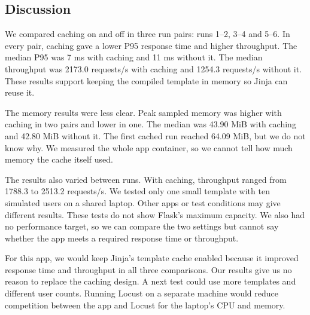 \documentclass[12pt,a4paper]{article}
\begin{document}
\subsection{Discussion}
\label{sec:performance-discussion}
We compared caching on and off in three run pairs: runs 1--2, 3--4 and 5--6. In every pair, caching gave a lower P95 response time and higher throughput. The median P95 was 7 ms with caching and 11 ms without it. The median throughput was 2173.0 requests/s with caching and 1254.3 requests/s without it. These results support keeping the compiled template in memory so Jinja can reuse it.

The memory results were less clear. Peak sampled memory was higher with caching in two pairs and lower in one. The median was 43.90 MiB with caching and 42.80 MiB without it. The first cached run reached 64.09 MiB, but we do not know why. We measured the whole app container, so we cannot tell how much memory the cache itself used.

The results also varied between runs. With caching, throughput ranged from 1788.3 to 2513.2 requests/s. We tested only one small template with ten simulated users on a shared laptop. Other apps or test conditions may give different results. These tests do not show Flask's maximum capacity. We also had no performance target, so we can compare the two settings but cannot say whether the app meets a required response time or throughput.

For this app, we would keep Jinja's template cache enabled because it improved response time and throughput in all three comparisons. Our results give us no reason to replace the caching design. A next test could use more templates and different user counts. Running Locust on a separate machine would reduce competition between the app and Locust for the laptop's CPU and memory.


\small


\end{document}
